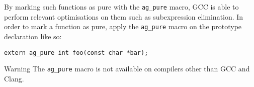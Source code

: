 By marking such functions as pure with the \texttt{ag\_pure} macro, GCC is able
to perform relevant optimisations on them such as subexpression elimination. In
order to mark a function as pure, apply the \texttt{ag\_pure} macro on the
prototype declaration like so:

\begin{lstlisting}[linewidth=1.0\linewidth]
extern ag_pure int foo(const char *bar);
\end{lstlisting}

\begin{bclogo}[logo=\bctakecare, noborder=true, couleurBarre=orange]{Warning}
  The \verb|ag_pure| macro is not available on compilers other than GCC and
  Clang.
\end{bclogo}

